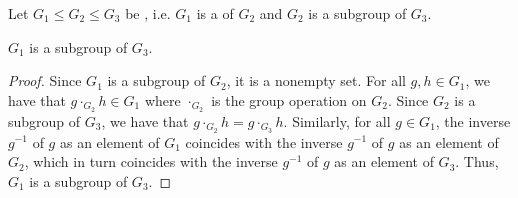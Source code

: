 \begin{lemma} \label{lemma:subgroups_are_transitive}
    Let $G_1 \leq G_2 \leq G_3$ be , i.e. $G_1$ is a  of $G_2$ and $G_2$ is a subgroup of $G_3$.

    $G_1$ is a subgroup of $G_3$.
\end{lemma}
\begin{proof}
    Since $G_1$ is a subgroup of $G_2$, it is a nonempty set. For all $g, h \in G_1$, we have that $g \cdot_{G_2} h \in G_1$ where $\cdot_{G_2}$ is the group operation on $G_2$. Since $G_2$ is a subgroup of $G_3$, we have that $g \cdot_{G_2} h = g \cdot_{G_3} h$. Similarly, for all $g \in G_1$, the inverse $g^{-1}$ of $g$ as an element of $G_1$ coincides with the inverse $g^{-1}$ of $g$ as an element of $G_2$, which in turn coincides with the inverse $g^{-1}$ of $g$ as an element of $G_3$. Thus, $G_1$ is a subgroup of $G_3$.
\end{proof}
